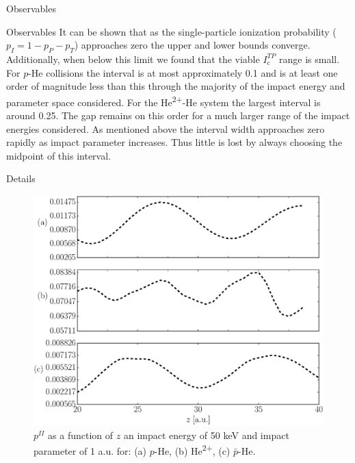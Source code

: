 \documentclass[letterpaper, 11 pt]{report}
\begin{document}
\begin{chapter}{Observables \label{chap:p-he2p-he}}
\begin{section}{Observables \label{sec:phe2p-obs}}
      It can be shown that as the single-particle ionization probability ($p_I = 1 - p_P - p_T$)
      approaches zero the upper and lower bounds converge. Additionally, when below this limit we found
      that the viable $I_\mathrm{c}^{TP}$ range is small. For $p$-He collisions the interval is at most
      approximately 0.1 and is at least one order of magnitude less than this through the majority of the
      impact energy and parameter space considered. For the He\textsuperscript{2+}-He system the largest
      interval is around 0.25. The gap remains on this order for a much larger range of the impact
      energies considered. As mentioned above the interval width approaches zero rapidly as impact
      parameter increases. Thus little is lost by always choosing the midpoint of this interval.

   \end{section}

   \begin{section}{Details \label{sec:phe2p-det}}
      
      \begin{figure}[ht]
         \begin{minipage}{.49\linewidth}
            
            \centering
            \includegraphics[width = \linewidth]{./images/poz.eps}
            \caption[Probabilities as a function of nuclear separation separation.]{$p^{II}$ as a
                     function of $z$ an impact energy of 50 keV and impact parameter of 1 a.u. for:
                     (a) $p$-He, (b) He\textsuperscript{2+}, (c) $\bar{p}$-He. \label{fig:poz}}
         \end{minipage} \hspace{0.04\linewidth} %
         \begin{minipage}{.49\linewidth}
            

\end{minipage}
\end{figure}
\end{section}
\end{chapter}
\end{document}
